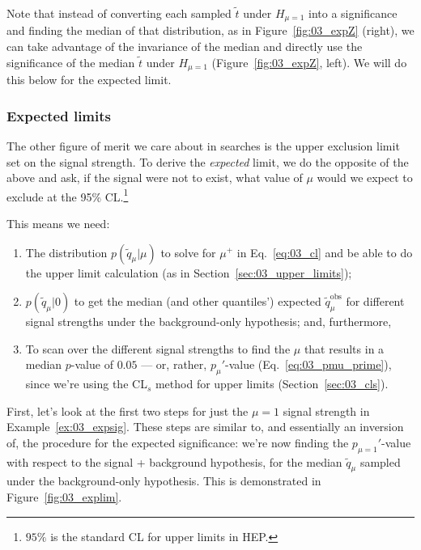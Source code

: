Note that instead of converting each sampled $\tilde{t}$ under $H_{\mu=1}$ into a significance and finding the median of that distribution, as in Figure~\ref{fig:03_expZ} (right), we can take advantage of the invariance of the median and directly use the significance of the median $\tilde{t}$ under $H_{\mu=1}$ (Figure~\ref{fig:03_expZ}, left).
We will do this below for the expected limit.

\subsubsection{Expected limits}

The other figure of merit we care about in searches is the upper exclusion limit set on the signal strength.
To derive the \textit{expected} limit, we do the opposite of the above and ask, if the signal were not to exist, what value of $\mu$ would we expect to exclude at the 95\% CL.\footnote{$95\%$ is the standard CL for upper limits in HEP.}

This means we need:
\begin{enumerate}
  \item The distribution $p(\tilde{q}_\mu|\mu)$ to solve for $\mu^+$ in Eq.~\ref{eq:03_cl} and be able to do the upper limit calculation (as in Section~\ref{sec:03_upper_limits});
  \item $p(\tilde{q}_\mu|0)$ to get the median (and other quantiles') expected $\tilde{q}_\mu^\mathrm{obs}$ for different signal strengths under the background-only hypothesis; and, furthermore,
  \item To scan over the different signal strengths to find the $\mu$ that results in a median $p$-value of $0.05$ --- or, rather, $p_\mu'$-value (Eq.~\ref{eq:03_pmu_prime}), since we're using the CL$_s$ method for upper limits (Section~\ref{sec:03_cls}).
\end{enumerate}

First, let's look at the first two steps for just the $\mu = 1$ signal strength in Example~\ref{ex:03_expsig}.
These steps are similar to, and essentially an inversion of, the procedure for the expected significance: we're now finding the $p_{\mu=1}'$-value with respect to the signal + background hypothesis, for the median $\tilde{q}_\mu$ sampled under the background-only hypothesis.
This is demonstrated in Figure~\ref{fig:03_explim}.

